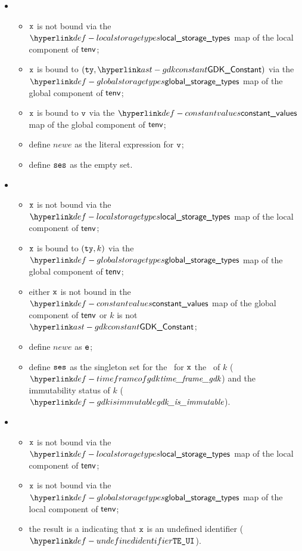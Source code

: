 \begin{itemize}
\begin{itemize}
    \item {}
    \begin{itemize}
    \item $\texttt{x}$ is not bound via the $\localstoragetypes$ map of the local component of $\textsf{tenv}$;
    \item $\texttt{x}$ is bound to $(\tty, \GDKConstant)$ via the $\globalstoragetypes$ map of the global component of $\textsf{tenv}$;
    \item $\texttt{x}$ is bound to $\texttt{v}$ via the $\constantvalues$ map of the global component of $\textsf{tenv}$;
    \item define $newe$ as the literal expression for $\texttt{v}$;
    \item define $\texttt{ses}$ as the empty set.
    \end{itemize}

    \item {}
    \begin{itemize}
      \item $\texttt{x}$ is not bound via the $\localstoragetypes$ map of the local component of $\textsf{tenv}$;
      \item $\texttt{x}$ is bound to $(\texttt{ty}, k)$ via the $\globalstoragetypes$ map of the global component of $\textsf{tenv}$;
      \item either $\texttt{x}$ is not bound in the $\constantvalues$ map of the global component of $\textsf{tenv}$ or $k$ is not $\GDKConstant$;
      \item define $newe$ as $\texttt{e}$;
      \item define $\texttt{ses}$ as the singleton set for the \ReadGlobalTerm\ for $\texttt{x}$ the \timeframeterm\ of
            $k$ ($\timeframeofgdk$) and the immutability status of $k$ ($\gdkisimmutable$).
    \end{itemize}

    \item {}
    \begin{itemize}
      \item $\texttt{x}$ is not bound via the $\localstoragetypes$ map of the local component of $\textsf{tenv}$;
      \item $\texttt{x}$ is not bound via the $\globalstoragetypes$ map of the local component of $\textsf{tenv}$;
      \item the result is a \typingerrorterm{} indicating that $\texttt{x}$ is an undefined identifier ($\UndefinedIdentifier$).
    \end{itemize}
  \end{itemize}
\end{itemize}

